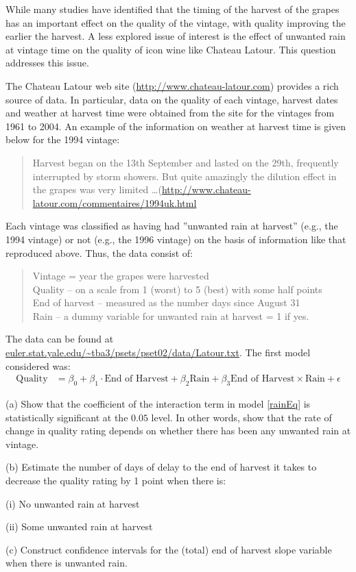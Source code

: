 \documentclass[12pt]{article}
\begin{document}
While many studies have identified that the timing of the harvest of the grapes has an important effect on the quality of the vintage, with quality improving the earlier the harvest. A less explored issue of interest is the effect of unwanted rain at vintage time on the quality of icon wine like Chateau Latour. This question addresses this issue.

The Chateau Latour web site (\url{http://www.chateau-latour.com}) provides a rich source of data. In particular, data on the quality of each vintage, harvest dates and weather at harvest time were obtained from the site for the vintages from 1961 to 2004. An example of the information on weather at harvest time is given below for the 1994 vintage:
\begin{quote}
Harvest began on the 13th September and lasted on the 29th, frequently interrupted by storm showers. But quite amazingly the dilution effect in the grapes was very limited \ldots (\url{http://www.chateau-latour.com/commentaires/1994uk.html}
\end{quote}
Each vintage was classified as having had ''unwanted rain at harvest'' (e.g., the 1994 vintage) or not (e.g., the 1996 vintage) on the basis of information like that reproduced above. Thus, the data consist of:
\begin{quote}
Vintage = year the grapes were harvested \\
Quality – on a scale from 1 (worst) to 5 (best) with some half points \\
End of harvest – measured as the number days since August 31 \\
Rain – a dummy variable for unwanted rain at harvest = 1 if yes.
\end{quote}
The data can be found at \url{euler.stat.yale.edu/~tba3/psets/pset02/data/Latour.txt}. The first model considered was:
\begin{align}
\text{Quality} &= \beta_0 +\beta_1 \cdot \text{End of Harvest} + \beta_2 \text{Rain}
  + \beta_3 \text{End of Harvest} \times \text{Rain} + \epsilon \label{rainEq}
\end{align}

(a) Show that the coefficient of the interaction term in model \ref{rainEq} is statistically significant at the $0.05$ level. In other words, show that the rate of change in quality rating depends on whether there has been any unwanted rain at vintage.

(b) Estimate the number of days of delay to the end of harvest it takes to decrease the quality rating by 1 point when there is:

\quad (i) No unwanted rain at harvest

\quad (ii) Some unwanted rain at harvest

(c) Construct confidence intervals for the (total) end of harvest slope variable when there is unwanted rain.
\end{document}
